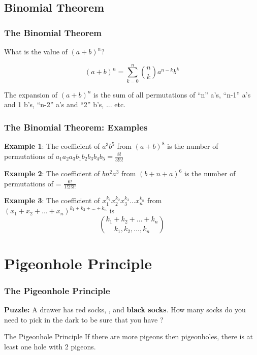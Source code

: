\documentclass{beamer}
\begin{document}
\subsection{Binomial Theorem}
\begin{frame}
  \frametitle{The Binomial Theorem}

  {\larger
  What is the value of $(a+b)^n$?

  \begin{equation}
    (a+b)^n = \sum^n_{k = 0}\binom{n}{k}a^{n-k}b^k
  \end{equation}

  \vfill
  
  The expansion of $(a+b)^n$ is the sum of all permutations of ``n''
  a's, ``n-1'' a's and 1 b's, ``n-2'' a's and ``2'' b's, ... etc.
  }
\end{frame}

\begin{frame}
  \frametitle{The Binomial Theorem: Examples}

  {\larger

  {\bf Example 1}: The coefficient of $a^3b^5$ from $(a+b)^8$ is the
  number of permutations of $a_1a_2a_3b_1b_2b_3b_4b_5 =
  \frac{8!}{3!5!}$

  \bigskip

  {\bf Example 2}: The coefficient of $bn^2a^3$ from $(b+n+a)^6$ is
  the number of permutations of  = $\frac{6!}{1!2!3!}$

  \bigskip

  {\bf Example 3}: The coefficient of
  $x_1^{k_1}x_2^{k_2}x_3^{k_3}\ldots x_n^{k_n}$ from $(x_1 + x_2 +
  \ldots + x_n)^{k_1+k_2+\ldots+k_n}$ is
  \begin{equation}
    \binom{k_1+k_2+\ldots+k_n}{k_1,k_2,\ldots,k_n}
  \end{equation}
  
  }
\end{frame}

\section{Pigeonhole Principle}

\begin{frame}
  \frametitle{The Pigeonhole Principle}

  {\larger

    {\bf Puzzle:} A drawer has \alert{red socks}, , and {\bf black socks}. How many socks do you need to
    pick in the dark to be sure that you have ?

    \vfill

    \begin{block}{The Pigeonhole Principle}
      If there are more pigeons then pigeonholes, there is at least
      one hole with 2 pigeons.
    \end{block}
  }
\end{frame}
\end{document}
